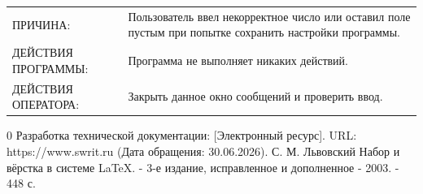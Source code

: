 \documentclass[14pt,a4paper,final]{extreport}
\begin{document}
\begin{center}
	\centering
	\begin{tabularx}{.85\textwidth}{>{\hsize=0.4\textwidth}X>{\hsize=0.4\textwidth}X}
		ПРИЧИНА: & Пользователь ввел некорректное число или	оставил поле пустым при попытке сохранить настройки программы. \\
		ДЕЙСТВИЯ ПРОГРАММЫ: & Программа не выполняет никаких действий. \\
		ДЕЙСТВИЯ ОПЕРАТОРА: &  Закрыть данное окно сообщений и проверить ввод. \\
	\end{tabularx}
\end{center}

\pagebreak

\fancyhead[C]{\bfseries\thepage\\\docstamp}  %

\begin{thebibliography}{0}
	 Разработка технической документации: [Электронный ресурс]. URL:
	https://www.swrit.ru (Дата обращения: 30.06.2026).
	 С. М. Львовский Набор и вёрстка в системе \LaTeX. - 3-е издание, исправленное и дополненное - 2003. - 448 с.
\end{thebibliography}
\pagebreak

\label{lastpage}
\end{document}
